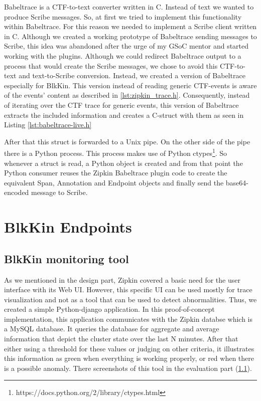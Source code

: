 Babeltrace is a CTF-to-text converter written in C. Instead of text we wanted to
produce Scribe messages. So, at first we tried to implement this functionality
within Babeltrace. For this reason we needed to implement a Scribe client
written in C. Although we created a working prototype of Babeltrace sending
messages to Scribe, this idea was abandoned after the urge of my GSoC mentor and
started working with the plugins. Although we could redirect Babeltrace output
to a process that would create the Scribe messages, we chose to avoid this
CTF-to-text and text-to-Scribe conversion. Instead, we created a version of
Babeltrace especially for BlkKin. This version instead of reading generic
CTF-events is aware of the events' content as described in
\ref{lst:zipkin_trace.h}. Consequently, instead of iterating over the CTF trace
for generic events, this version of Babeltrace extracts the included information
and creates a C-struct with them as seen in Listing \ref{lst:babeltrace-live.h} 


After that this struct is forwarded to a Unix pipe. On the other side of the
pipe there is a Python process. This process makes use of Python
ctypes\footnote{https://docs.python.org/2/library/ctypes.html}. So whenever a
struct is read, a Python object is created and from that point the Python
consumer reuses the Zipkin Babeltrace plugin code to create the equivalent Span,
Annotation and Endpoint objects and finally send the base64-encoded message to
Scribe.

\section{BlkKin Endpoints}\label{sec:blkin-hadoop}

\subsection{BlkKin monitoring tool}
As we mentioned in the design part, Zipkin covered a basic need for the user
interface with its Web UI. However, this specific UI can be used mostly for
trace visualization and not as a tool that can be used to detect abnormalities.
Thus, we created a simple Python-django application. In this proof-of-concept
implementation, this application communicates with the Zipkin databse which is a
MySQL database. It queries the database for aggregate and average information
that depict the cluster state over the last N minutes. After that either using a
threshold for these values or judging on other criteria, it illustrates this
information as green when everything is working properly, or red when there is a
possible anomaly. There screenshots of this tool in the evaluation part
(\ref{}).

